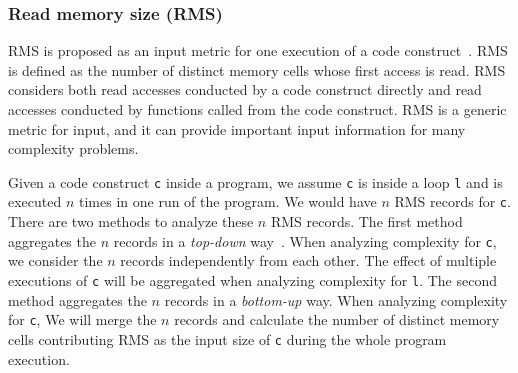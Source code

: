 \subsubsection{Read memory size (RMS)}
RMS is proposed as an input metric for one 
execution of a code construct~\cite{Aprof1,Aprof2}. 
RMS is defined as the number of distinct memory cells 
whose first access is read. 
RMS considers both read accesses conducted by a code construct directly 
and read accesses conducted by 
functions called from the code construct. 
RMS is a generic metric for input, 
and it can provide important input information for many complexity problems.   

Given a code construct \texttt{c} inside a program, 
we assume \texttt{c} is inside a loop \texttt{l} and is executed
$n$ times in one run of the program. 
We would have $n$ RMS records for \texttt{c}. 
There are two methods to analyze these $n$ RMS records.
The first method aggregates the $n$ records in a \textit{top-down} way~\cite{Aprof1,Aprof2}.
When analyzing complexity for \texttt{c}, 
we consider the $n$ records independently from each other. 
The effect of multiple executions of \texttt{c} 
will be aggregated when analyzing complexity for \texttt{l}.
The second method aggregates the $n$ records in a \textit{bottom-up} way.
When analyzing complexity for \texttt{c}, 
We will merge the $n$ records and calculate the number of distinct memory cells 
contributing RMS as the input size of \texttt{c} during the whole program execution.

